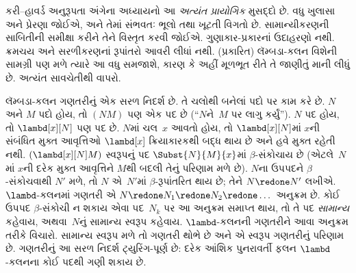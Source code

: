 \OLEndChapterHook
\endgroup

\begingroup
\makeatletter{}\makeatother

\label{guunit:OLP-0690}


\begin{editorial}
  કરી--હાવર્ડ અનુરૂપતા અંગેના અધ્યાયનો આ
  \emph{અત્યંત પ્રાયોગિક} મુસદ્દો છે.
  વધુ ખુલાસા અને પ્રેરણા જોઈએ, અને તેમાં
  સંભવતઃ ભૂલો તથા ખૂટતી વિગતો છે.
  સામાન્યીકરણની સાબિતીની સમીક્ષા કરીને
  તેને વિસ્તૃત કરવી જોઈએ. ગુણાકાર-પ્રકારનાં
  ઉદાહરણો નથી. ક્રમચય અને સરળીકરણનાં
  રૂપાંતરો આવરી લીધાં નથી. (પ્રકારિત)
  લૅમ્બડા-કલન વિશેની સામગ્રી પણ મળે
  ત્યારે આ વધુ સમજાશે, કારણ કે અહીં
  મૂળભૂત રીતે તે જાણીતું માની લીધું છે.
  અત્યંત સાવચેતીથી વાપરો.
\end{editorial}

\begingroup
\makeatletter{}\makeatother


\label{guunit:OLP-0686}


લૅમ્બડા-કલન ગણતરીનું એક સરળ નિદર્શ છે. તે
ચલોથી બનેલાં પદો પર કામ કરે છે. $N$ અને $M$
પદો હોય, તો $(NM)$ પણ એક પદ છે
(``$N$ને~$M$ પર લાગુ કર્યું''). $N$ પદ
હોય, તો $\lambd[x][N]$ પણ પદ છે. $N$માં
ચલ~$x$ આવતો હોય, તો $\lambd[x][N]$માં
$x$ની સંબંધિત મુક્ત આવૃત્તિઓ $\lambd[x]$ ક્રિયાકારકથી
બદ્ધ થાય છે અને હવે મુક્ત રહેતી નથી.
$(\lambd[x][N]M)$ સ્વરૂપનું પદ
$\Subst{N}{M}{x}$માં $\beta$-સંકોચાય છે
(એટલે~$N$માં $x$ની દરેક મુક્ત આવૃત્તિને
$M$થી બદલી તેનું પરિણામ મળે છે).
$N$ના ઉપપદને $\beta$-સંકોચવાથી $N'$
મળે, તો $N$ એ~$N'$માં $\beta$-રૂપાંતરિત
થાય છે; તેને $N \redone N'$ લખીએ.
$\lambd$-કલનમાં ગણતરી એ
$N \redone N_1 \redone N_2 \redone \dots$
અનુક્રમ છે. કોઈ ઉપપદ $\beta$-સંકોચી ન
શકાય એવા પદ~$N_k$ પર આ અનુક્રમ સમાપ્ત
થાય, તો તે પદ \emph{સામાન્ય} કહેવાય,
અથવા~$N$નું સામાન્ય સ્વરૂપ કહેવાય. $\lambd$-કલનની
ગણતરીને આવા અનુક્રમ તરીકે વિચારો. સામાન્ય
સ્વરૂપ મળે તો ગણતરી થોભે છે અને એ સ્વરૂપ
ગણતરીનું પરિણામ છે. ગણતરીનું આ સરળ
નિદર્શ ટ્યુરિંગ-પૂર્ણ છે: દરેક આંશિક પુનરાવર્તી
ફલન $\lambd$-કલનના કોઈ પદથી ગણી શકાય છે.

